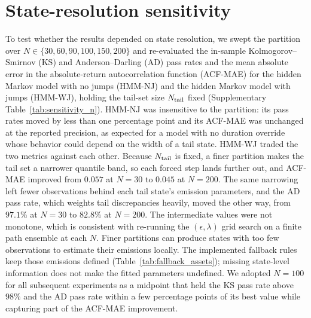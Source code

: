 \section{State-resolution sensitivity}
\label{sec:supp-sensitivity}

To test whether the results depended on state resolution, we swept the
partition over $N \in \{30, 60, 90, 100, 150, 200\}$ and
re-evaluated the in-sample Kolmogorov--Smirnov (KS) and
Anderson--Darling (AD) pass rates and the mean absolute error in the
absolute-return autocorrelation function (ACF-MAE) for the hidden
Markov model with no jumps (HMM-NJ) and the hidden Markov model with
jumps (HMM-WJ), holding the tail-set size $N_{\rm tail}$ fixed
(Supplementary Table~\ref{tab:sensitivity_n}). HMM-NJ was insensitive to the
partition: its pass rates moved by less than one percentage point and
its ACF-MAE was unchanged at the reported precision, as expected for a
model with no duration override whose behavior could depend on the
width of a tail state. HMM-WJ traded the two metrics against each other. Because
$N_{\rm tail}$ is fixed, a finer partition makes the tail set a
narrower quantile band, so each forced step lands further out, and
ACF-MAE improved from $0.057$ at $N = 30$ to $0.045$ at $N = 200$. The
same narrowing left fewer observations behind each tail state's
emission parameters, and the AD pass rate, which weights tail
discrepancies heavily, moved the other way, from $97.1\%$ at $N = 30$
to $82.8\%$ at $N = 200$. The intermediate values were not monotone,
which is consistent with re-running the $(\epsilon, \lambda)$ grid
search on a finite path ensemble at each $N$. Finer partitions can
produce states with too few observations to estimate their emissions
locally. The implemented fallback rules keep those emissions defined
(Table~\ref{tab:fallback_assets}); missing state-level information
does not make the fitted parameters undefined. We adopted $N = 100$ for
all subsequent experiments as a midpoint that held the KS pass rate
above $98\%$ and the AD pass rate within a few percentage points of its
best value while capturing part of the ACF-MAE improvement.

